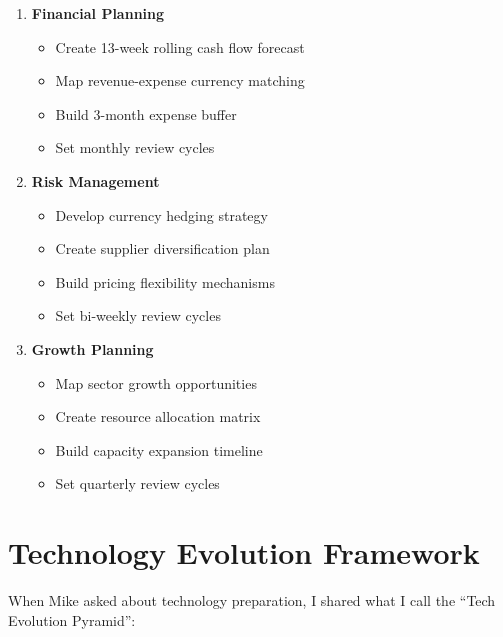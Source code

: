 \begin{tcolorbox}[colback=white,colframe=primarydark,title=\textbf{Economic Rebalancing: Action Steps}]
    \begin{enumerate}
        \item \textbf{Financial Planning}
        \begin{itemize}
            \item Create 13-week rolling cash flow forecast
            \item Map revenue-expense currency matching
            \item Build 3-month expense buffer
            \item Set monthly review cycles
        \end{itemize}

        \item \textbf{Risk Management}
        \begin{itemize}
            \item Develop currency hedging strategy
            \item Create supplier diversification plan
            \item Build pricing flexibility mechanisms
            \item Set bi-weekly review cycles
        \end{itemize}

        \item \textbf{Growth Planning}
        \begin{itemize}
            \item Map sector growth opportunities
            \item Create resource allocation matrix
            \item Build capacity expansion timeline
            \item Set quarterly review cycles
        \end{itemize}
    \end{enumerate}
\end{tcolorbox}


\section{Technology Evolution Framework}\label{sec:tech-evolution-framework}

When Mike asked about technology preparation, I shared what I call the ``Tech Evolution Pyramid'':

